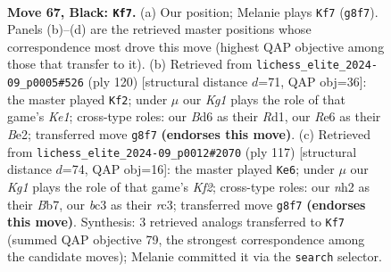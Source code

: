 \documentclass[11pt]{article}
\begin{document}
\begin{figure}[p]\centering
\begin{subfigure}{0.46\textwidth}\centering
\resizebox{\linewidth}{!}{%
\newchessgame
\chessboard[
  setfen={6k1/6p1/p2br2r/Pppb1p1p/2p2P1P/2B1P1P1/1P2K2N/1R4R1 b - - 7 67},
  showmover=false,
  pgfstyle=straightmove, color=movearrow, markmove={g8-f7}
]}
\caption{}
\end{subfigure}\hfill
\begin{subfigure}{0.46\textwidth}\centering
\resizebox{\linewidth}{!}{%
\newchessgame
\chessboard[
  setfen={2r4r/4kp2/2b1p1p1/1p1pP2p/pP3P2/P1P1R1P1/4B2P/3RK3 w - - 61 61},
  showmover=false,
  pgfstyle=straightmove, color=movearrow, markmove={e1-f2}
]}
\caption{}
\end{subfigure}
\\[4pt]
\begin{subfigure}{0.46\textwidth}\centering
\resizebox{\linewidth}{!}{%
\newchessgame
\chessboard[
  setfen={r7/1b3k2/1Pp2pp1/r1Pp3p/PK2p3/2R1P1P1/4BP2/R7 b - - 5 59},
  showmover=false,
  pgfstyle=straightmove, color=movearrow, markmove={f7-e6}
]}
\caption{}
\end{subfigure}\hfill

\caption{\textbf{Move 67, Black: \texttt{Kf7}.} (a) Our position; Melanie plays \texttt{Kf7} (\texttt{g8f7}). Panels (b)--(d) are the retrieved master positions whose correspondence most drove this move (highest QAP objective among those that transfer to it). (b) Retrieved from \texttt{lichess\_elite\_2024-09\_p0005\#526} (ply 120) [structural distance $d$=71, QAP obj=36]: the master played \texttt{Kf2}; under $\mu$ our \emph{Kg1} plays the role of that game's \emph{Ke1}; cross-type roles: our \emph{B}d6 as their \emph{R}d1, our \emph{R}e6 as their \emph{B}e2; transferred move \texttt{g8f7} \textbf{(endorses this move)}. (c) Retrieved from \texttt{lichess\_elite\_2024-09\_p0012\#2070} (ply 117) [structural distance $d$=74, QAP obj=16]: the master played \texttt{Ke6}; under $\mu$ our \emph{Kg1} plays the role of that game's \emph{Kf2}; cross-type roles: our \emph{n}h2 as their \emph{B}b7, our \emph{b}c3 as their \emph{r}c3; transferred move \texttt{g8f7} \textbf{(endorses this move)}. Synthesis: 3 retrieved analogs transferred to \texttt{Kf7} (summed QAP objective 79, the strongest correspondence among the candidate moves); Melanie committed it via the \texttt{search} selector.}
\label{fig:thought-m133}
\end{figure}

\clearpage
\end{document}
